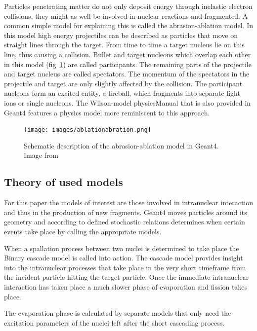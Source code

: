 Particles penetrating matter do not only deposit energy through inelastic electron collisions, they might as well be involved in nuclear reactions and fragmented. A common simple model for explaining this is called the abrasion-ablation model. In this model high energy projectiles can be described as particles that move on straight lines through the
target. From time to time a target nucleus lie on this line, thus causing a collision. Bullet
and target nucleons which overlap each other in this model (fig~\ref{fig:ablationabration}) are called participants. The remaining parts of the projectile and target nucleus are called spectators. The momentum of the spectators in the projectile and target are only slightly affected by the collision. The participant nucleons form an excited entity, a fireball, which fragments into separate light ions or single nucleons.
The Wilson-model {physicsManual} that is also provided in Geant4 features a physics model more reminiscent to this approach.
\begin{figure}[h]
\begin{center}
\texttt{[image: images/ablationabration.png]}  
\caption{Schematic description of the abrasion-ablation model in Geant4.~\cite{physicsManual} Image from~\cite{gunzert-marx}} %
 \label{fig:ablationabration}
 \end{center}
 \end{figure}



\subsection{Theory of used models} %

For this paper the models of interest are those involved in intranuclear interaction and thus in the production of new fragments. Geant4 moves particles around its geometry and according to defined stochastic relations determines when certain events take place by calling the appropriate models.

When a spallation process between two nuclei is determined to take place the Binary cascade model is called into action. The cascade model provides insight into the intranuclear processes that take place in the very short timeframe from the incident particle hitting the target particle. Once the immediate intranuclear interaction has taken place a much slower phase of evaporation and fission takes place. 

The evaporation phase is calculated by separate models that only need the excitation parameters of the nuclei left after the short cascading process.

